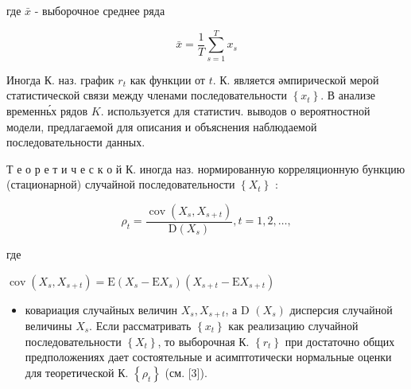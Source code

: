 \documentclass[10pt]{article}
\begin{document}
где $\bar{x}$ - выборочное среднее ряда



\[

\bar{x}=\frac{1}{T} \sum_{s=1}^{T} x_{s}

\]



Иногда К. наз. график $r_{t}$ как функции от $t$. К. является әмпирической мерой статистической связи между членами последовательности $\left\{x_{t}\right\}$. В анализе временнь́х рядов $K$. используется для статистич. выводов о вероятностной модели, предлагаемой для описания и объяснения наблюдаемой последовательности данных.



Т е о р е т и ч е с к о й К. иногда наз. нормированную корреляционную бункцию (стационарной) случайной последовательности $\left\{X_{t}\right\}$ :



\[

\rho_{t}=\frac{\operatorname{cov}\left(X_{s}, X_{s+t}\right)}{\mathrm{D}\left(X_{s}\right)}, t=1,2, \ldots,

\]



где



$\operatorname{cov}\left(X_{s}, X_{s+t}\right)=\mathrm{E}\left(X_{s}-\mathrm{E} X_{s}\right)\left(X_{s+t}-\mathrm{E} X_{s+t}\right)$



\begin{itemize}

  \item ковариация случайных величин $X_{s}, X_{s+t}$, а D $\left(X_{s}\right)$ дисперсия случайной величины $X_{s}$. Если рассматривать $\left\{x_{t}\right\}$ как реализацию случайной последовательности $\left\{X_{t}\right\}$, то выборочная К. $\left\{r_{t}\right\}$ при достаточно общих предположениях дает состоятельные и асимптотически нормальные оценки для теоретической К. $\left\{\rho_{t}\right\}$ (см. [3]).

\end{itemize}
\end{document}
